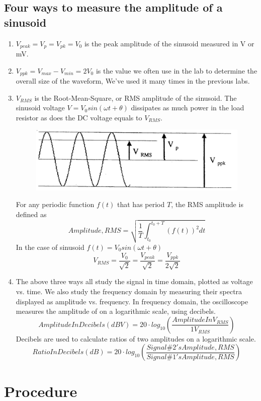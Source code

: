 \documentclass[12pt]{article}
\begin{document}
\subsection{Four ways to measure the amplitude of a sinusoid}
\begin{enumerate}
\item $V_{peak}=V_p=V_{pk}=V_0$ is the peak amplitude of the sinusoid measured in V or mV.
\item $V_{ppk}=V_{max}-V_{min}=2V_0$ is the value we often use in the lab to determine the overall size of the waveform, We've used it many times in the previous labs.
\item $V_{RMS}$ is the Root-Mean-Square, or RMS amplitude of the sinusoid. The sinusoid voltage $V=V_0sin(\omega t+\theta)$ dissipates as much power in the load resistor as does the DC voltage equals to $V_{RMS}$.
\begin{figure}[H]
\centering
\includegraphics[scale=0.4]{P7.jpg}
\end{figure}
For any periodic function $f(t)$ that has period $T$, the RMS amplitude is defined as
$$Amplitude,RMS=\sqrt{\frac{1}{T}\int^{t_0+T}_{t_0}(f(t))^2dt}$$
In the case of sinusoid $f(t)=V_0sin(\omega t+\theta)$
$$V_{RMS}=\frac{V_0}{\sqrt{2}}=\frac{V_{peak}}{\sqrt{2}}=\frac{V_{ppk}}{2\sqrt{2}}$$
\item The above three ways all study the signal in time domain, plotted as voltage vs.
time. We also study the frequency domain by measuring their spectra displayed as amplitude vs. frequency. In frequency domain, the oscilloscope measures the amplitude of on a logarithmic scale, using decibels.
$$AmplitudeInDecibels(dBV)=20\cdot log_{10}(\frac{AmplitudeInV_{RMS}}{1V_{RMS}})$$
Decibels are used to calculate ratios of two amplitudes on a logarithmic scale.
$$RatioInDecibels(dB)=20\cdot log_{10}(\frac{Signal\#2'sAmplitude,RMS}{Signal\#1'sAmplitude,RMS})$$
\end{enumerate}
\section{Procedure}
\end{document}
